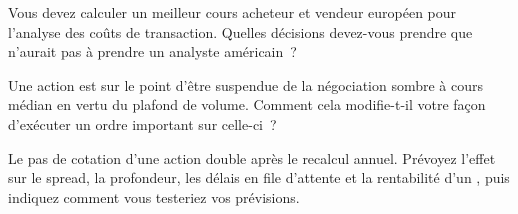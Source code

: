 \begin{interviewq}\label{iq:m1:european-equity-market-structure:4}
Vous devez calculer un meilleur cours acheteur et vendeur européen pour l'analyse des coûts de transaction.
Quelles décisions devez-vous prendre que n'aurait pas à prendre un analyste américain~?
\end{interviewq}

\begin{interviewq}\label{iq:m1:european-equity-market-structure:5}
Une action est sur le point d'être suspendue de la négociation sombre à cours médian en vertu du plafond de
volume. Comment cela modifie-t-il votre façon d'exécuter un ordre important sur celle-ci~?
\end{interviewq}

\begin{interviewq}\label{iq:m1:european-equity-market-structure:6}
Le pas de cotation d'une action double après le recalcul annuel. Prévoyez
l'effet sur le spread, la profondeur, les délais en file d'attente et la rentabilité d'un , puis
indiquez comment vous testeriez vos prévisions.
\end{interviewq}
